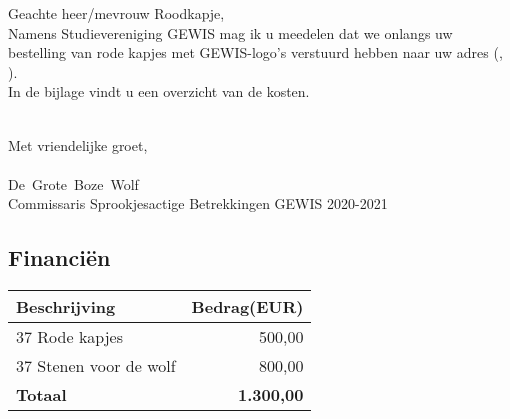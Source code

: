 \documentclass[
 digital,         %
]{GEWISLetter}
\newcommand{\dewolf}{De~Grote~Boze~Wolf\xspace}
\newcommand{\rood}{Roodkapje\xspace}
\begin{document}
\GEWISfirstpage                 %
\printadresenkenmerk            %

Geachte heer/mevrouw \rood,\\

Namens Studievereniging GEWIS mag ik u meedelen dat we onlangs uw bestelling van rode kapjes met GEWIS-logo's verstuurd hebben naar uw adres (\GEWISstreet, \GEWISpostcodecity).\\

In de bijlage vindt u een overzicht van de kosten.\\

\lipsum[1]\\

\lipsum[2-5]

Met vriendelijke groet,\\[3\baselineskip] \\
\dewolf\\
Commissaris Sprookjesactige Betrekkingen GEWIS 2020-2021


\resetpagecount
\GEWISsmallheading
\newpage
\subsection{Financi\"en}
\begin{tabularx}{\textwidth}{X r}\toprule
	Beschrijving           & Bedrag(EUR)\\\midrule
	37 Rode kapjes         & 500,00\\
	37 Stenen voor de wolf & 800,00\\
	\cmidrule{2-2} \textbf{Totaal} & {\bfseries 1.300,00}\\\bottomrule
\end{tabularx}



\resetpagecount
\GEWISfirstpage
\printadresenkenmerk

\lipsum[1]
\end{document}
